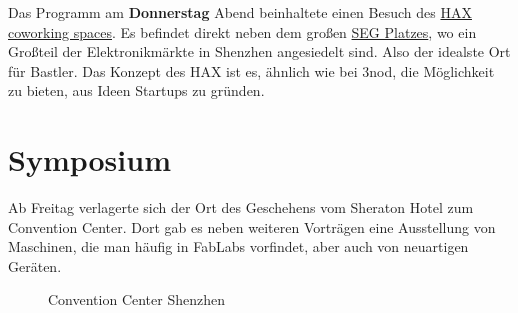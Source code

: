 \documentclass{\basedir/fablab-document}
\begin{document}
Das Programm am \textbf{Donnerstag} Abend beinhaltete einen Besuch des
\href{https://hax.co/about/}{HAX coworking spaces}. Es befindet direkt neben
dem großen \href{https://en.wikipedia.org/wiki/SEG_Plaza}{SEG Platzes},
wo ein Großteil der Elektronikmärkte in Shenzhen angesiedelt sind. Also
der idealste Ort für Bastler. Das Konzept des HAX ist es, ähnlich wie
bei 3nod, die Möglichkeit zu bieten, aus Ideen Startups zu gründen.

\section*{Symposium}

Ab Freitag verlagerte sich der Ort des Geschehens vom Sheraton Hotel zum
Convention Center. Dort gab es neben weiteren Vorträgen eine Ausstellung
von Maschinen, die man häufig in FabLabs vorfindet, aber auch von
neuartigen Geräten.

\begin{figure}[htbp]
	\noindent{}
	\caption{Convention Center Shenzhen}
	\label{convention_center}
\end{figure}
\end{document}
